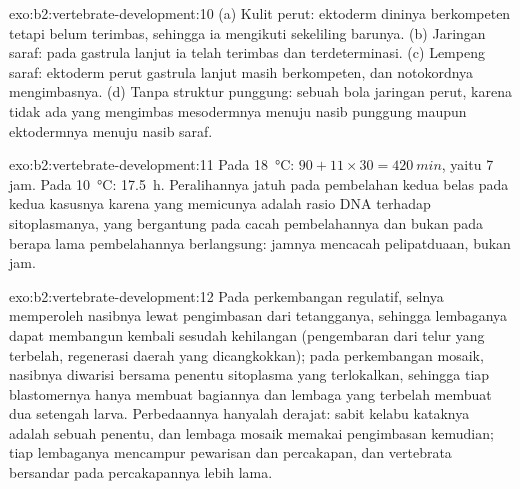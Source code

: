 \begin{solution}{exo:b2:vertebrate-development:10}
(a) Kulit perut: ektoderm dininya berkompeten tetapi belum terimbas,
sehingga ia mengikuti sekeliling barunya. (b) Jaringan saraf: pada
gastrula lanjut ia telah terimbas dan terdeterminasi. (c) Lempeng
saraf: ektoderm perut gastrula lanjut masih berkompeten, dan
notokordnya mengimbasnya. (d) Tanpa struktur punggung: sebuah bola
jaringan perut, karena tidak ada yang mengimbas mesodermnya menuju
nasib punggung maupun ektodermnya menuju nasib saraf.
\end{solution}

\begin{solution}{exo:b2:vertebrate-development:11}
Pada \qty{18}{\celsius}: $90 + 11\times 30 = \qty{420}{min}$, yaitu 7
jam. Pada \qty{10}{\celsius}: \qty{17.5}{h}. Peralihannya jatuh pada
pembelahan kedua belas pada kedua kasusnya karena yang memicunya adalah
rasio DNA terhadap sitoplasmanya, yang bergantung pada cacah
pembelahannya dan bukan pada berapa lama pembelahannya berlangsung:
jamnya mencacah pelipatduaan, bukan jam.
\end{solution}

\begin{solution}{exo:b2:vertebrate-development:12}
Pada perkembangan regulatif, selnya memperoleh nasibnya lewat
pengimbasan dari tetangganya, sehingga lembaganya dapat membangun
kembali sesudah kehilangan (pengembaran dari telur yang terbelah,
regenerasi daerah yang dicangkokkan); pada perkembangan mosaik,
nasibnya diwarisi bersama penentu sitoplasma yang terlokalkan, sehingga
tiap blastomernya hanya membuat bagiannya dan lembaga yang terbelah
membuat dua setengah larva. Perbedaannya hanyalah derajat: sabit kelabu
kataknya adalah sebuah penentu, dan lembaga mosaik memakai pengimbasan
kemudian; tiap lembaganya mencampur pewarisan dan percakapan, dan
vertebrata bersandar pada percakapannya lebih lama.
\end{solution}

